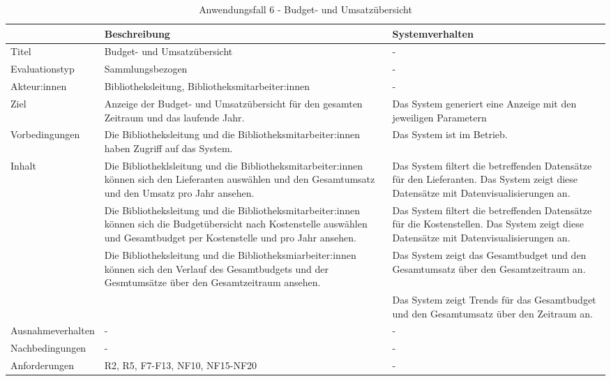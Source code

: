 \begingroup
\setlength{\tabcolsep}{10pt} %
\renewcommand{\arraystretch}{1.25} 
\begin{table}[h]
    \centering
    \begin{adjustbox}{max width=\textwidth}
    \begin{tabular}{lp{7.0cm}p{7.0cm}}
       \toprule
       \textbf{}          & \textbf{Beschreibung} &\textbf{Systemverhalten}\\
       \midrule
        Titel                            &Budget- und Umsatzübersicht& -\\
        Evaluationstyp                   &Sammlungsbezogen                   & -\\
        Akteur:innen                     &Bibliotheksleitung, Bibliotheksmitarbeiter:innen& -\\
        Ziel                             &Anzeige der Budget- und Umsatzübersicht für den gesamten Zeitraum und das laufende Jahr.& Das System generiert eine Anzeige mit den jeweiligen Parametern\\
        Vorbedingungen                   &Die Bibliotheksleitung und die Bibliotheksmitarbeiter:innen haben Zugriff auf das System.& Das System ist im Betrieb.\\
        Inhalt                &Die Bibliotheklsleitung und die Bibliotheksmitarbeiter:innen können sich den Lieferanten auswählen und den Gesamtumsatz und den Umsatz pro Jahr ansehen.& Das System filtert die betreffenden Datensätze für den Lieferanten. Das System zeigt diese Datensätze mit Datenvisualisierungen an.\\
                                         &Die Bibliotheksleitung und die Bibliotheksmitarbeiter:innen können sich die Budgetübersicht nach Kostenstelle auswählen und Gesamtbudget per Kostenstelle und pro Jahr ansehen. &Das System filtert die betreffenden Datensätze für die Kostenstellen. Das System zeigt diese Datensätze mit Datenvisualisierungen an.\\
                                         &Die Bibliotheksleitung und die Bibliotheksmiarbeiter:innen können sich den Verlauf des Gesamtbudgets und der Gesmtumsätze über den Gesamtzeitraum ansehen. &Das System zeigt das Gesamtbudget und den Gesamtumsatz über den Gesamtzeitraum an.\\
                                         & &Das System zeigt Trends für das Gesamtbudget und den Gesamtumsatz über den Zeitraum an.\\
        Ausnahmeverhalten               &- & -\\
        Nachbedingungen                 &-& -\\

        Anforderungen                   &R2, R5, F7-F13, NF10, NF15-NF20& -\\
        \bottomrule
    \end{tabular}
    \end{adjustbox}
    \caption{%
    Anwendungsfall 6 - Budget- und Umsatzübersicht   }
    \label{tab:AF_BudgetUmsatz}
    \end{table}
\endgroup


